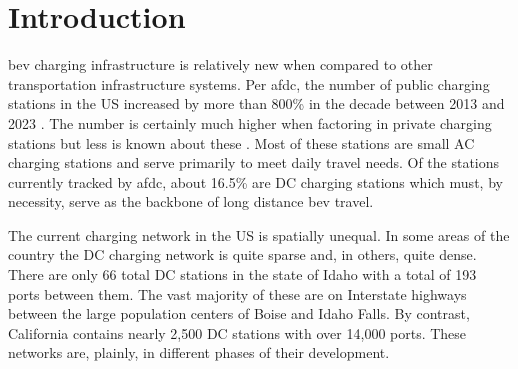 \section{Introduction}


\gls{bev} charging infrastructure is relatively new when compared to other transportation infrastructure systems. Per \gls{afdc}, the number of public charging stations in the US increased by more than 800\% in the decade between 2013 and 2023 \cite{Brown_2023}. The number is certainly much higher when factoring in private charging stations but less is known about these \cite{Davis_2022}. Most of these stations are small AC charging stations and serve primarily to meet daily travel needs. Of the stations currently tracked by \gls{afdc}, about 16.5\% are DC charging stations which must, by necessity, serve as the backbone of long distance \gls{bev} travel.

The current charging network in the US is spatially unequal. In some areas of the country the DC charging network is quite sparse and, in others, quite dense. There are only 66 total DC stations in the state of Idaho with a total of 193 ports between them. The vast majority of these are on Interstate highways between the large population centers of Boise and Idaho Falls. By contrast, California contains nearly 2,500 DC stations with over 14,000 ports. These networks are, plainly, in different phases of their development.


